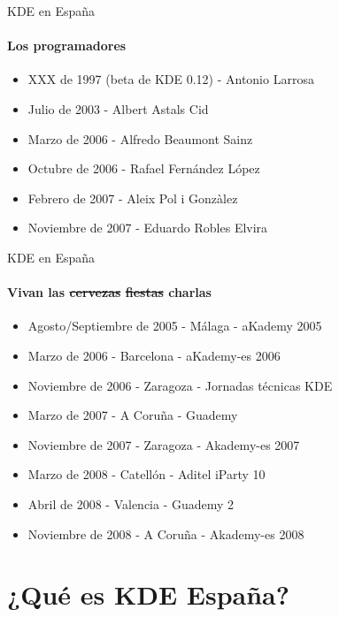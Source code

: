 \documentclass[12pt]{beamer}
\begin{document}
\begin{frame}{KDE en España}
	\framesubtitle{Los programadores}
	\begin{itemize}
		\item XXX de 1997 (beta de KDE 0.12) - Antonio Larrosa
 		\item Julio de 2003 - Albert Astals Cid
		\item Marzo de 2006 - Alfredo Beaumont Sainz
		\item Octubre de 2006 - Rafael Fernández López
		\item Febrero de 2007 - Aleix Pol i Gonzàlez
		\item Noviembre de 2007 - Eduardo Robles Elvira
	\end{itemize}
\end{frame}

\begin{frame}{KDE en España}
	\framesubtitle{Vivan las \sout{cervezas} \sout{fiestas} charlas}
	\begin{itemize}
		\item Agosto/Septiembre de 2005 - Málaga - aKademy 2005
		\item Marzo de 2006 - Barcelona - aKademy-es 2006
		\item Noviembre de 2006 - Zaragoza - Jornadas técnicas KDE
		\item Marzo de 2007 - A Coruña - Guademy
		\item Noviembre de 2007 - Zaragoza - Akademy-es 2007
		\item Marzo de 2008 - Catellón - Aditel iParty 10
		\item Abril de 2008 - Valencia - Guademy 2
		\item Noviembre de 2008 - A Coruña - Akademy-es 2008
	\end{itemize}
\end{frame}




\section{¿Qué es KDE España?}
\end{document}
